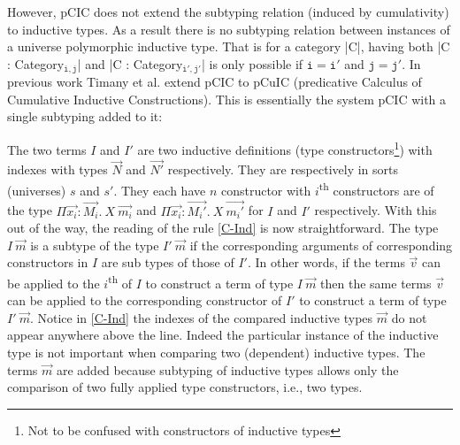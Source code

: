 \documentclass{easychair}
\begin{document}
However, pCIC does not extend the subtyping relation (induced by
cumulativity) to inductive types. As a result there is no subtyping
relation between instances of a universe polymorphic inductive type.
That is for a category \Coqe|C|, having both
\Coqe|C : Category$_{\mathtt{i, j}}$| and \Coqe|C : Category$_{\mathtt{i', j'}}$|
is only possible if $\mathtt{i = i'}$ and $\mathtt{j = j'}$.
In previous work Timany et al. \cite{DBLP:conf/ictac/Timany015} extend
pCIC to pCuIC (predicative Calculus of Cumulative Inductive
Constructions). This is essentially the system pCIC with a single
subtyping added to it:\footnotemark{}
\begin{mathpar}
\end{mathpar}
%
The two terms $I$ and $I'$ are two inductive definitions (type
constructors\footnote{Not to be confused with constructors of
  inductive types}) with indexes with types $\vec{N}$ and $\vec{N'}$
respectively. They are respectively in sorts (universes) $s$ and $s'$.
They each have $n$ constructor with $i$\textsuperscript{th}
constructors are of the type $\Pi\vec{x_i} : \vec{M_i}.~X~\vec{m_i}$
and $\Pi\vec{x_i} : \vec{M_i'}.~X~\vec{m_i'}$ for $I$ and $I'$
respectively. With this out of the way, the reading of the rule
\ref{C-Ind} is now straightforward. The type $I~\vec{m}$ is a subtype
of the type $I'~\vec{m}$ if the corresponding arguments of
corresponding constructors in $I$ are sub types of those of $I'$.  In
other words, if the terms $\vec{v}$ can be applied to the
$i$\textsuperscript{th} of $I$ to construct a term of type $I~\vec{m}$
then the same terms $\vec{v}$ can be applied to the corresponding
constructor of $I'$ to construct a term of type $I'~\vec{m}$.  Notice
in \ref{C-Ind} the indexes of the compared inductive types $\vec{m}$
do not appear anywhere above the line. Indeed the particular instance
of the inductive type is not important when comparing two (dependent)
inductive types. The terms $\vec{m}$ are added because subtyping of
inductive types allows only the comparison of two fully applied type
constructors, i.e., two types.
\end{document}
